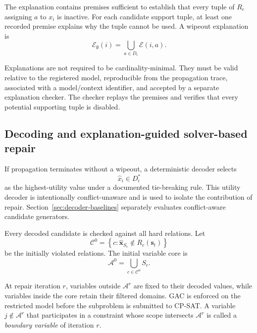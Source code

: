 \documentclass[pdflatex,sn-mathphys-num,iicol,oneside]{sn-jnl}
\newcommand{\gac}{\textsc{GAC}\xspace}
\newcommand{\cpsat}{\textsc{CP-SAT}\xspace}
\begin{document}
The explanation contains premises sufficient to establish that every
tuple of $R_c$ assigning $a$ to $x_i$ is inactive. For each candidate
support tuple, at least one recorded premise explains why the tuple
cannot be used. A wipeout explanation is
\begin{equation}
\mathcal{E}_{\emptyset}(i)
=
\bigcup_{a\in D_i}
\mathcal{E}(i,a).
\end{equation}

Explanations are not required to be cardinality-minimal. They must be
valid relative to the registered model, reproducible from the
propagation trace, associated with a model/context identifier, and
accepted by a separate explanation checker. The checker replays the
premises and verifies that every potential supporting tuple is
disabled.

\subsection{Decoding and explanation-guided solver-based repair}
\label{sec:repair}

If propagation terminates without a wipeout, a deterministic decoder
selects
\begin{equation}
\widehat{x}_i\in D_i^{*}
\end{equation}
as the highest-utility value under a documented tie-breaking rule.
This utility decoder is intentionally conflict-unaware and is used to
isolate the contribution of repair. Section~\ref{sec:decoder-baselines}
separately evaluates conflict-aware candidate generators.

Every decoded candidate is checked against all hard relations. Let
\begin{equation}
\mathcal{C}^{0}
=
\left\{
c:
\widehat{\bm{x}}_{S_c}
\notin
R_c(\bm{s}_t)
\right\}
\end{equation}
be the initially violated relations. The initial variable core is
\begin{equation}
\mathcal{A}^{0}
=
\bigcup_{c\in\mathcal{C}^{0}}S_c.
\end{equation}

At repair iteration $r$, variables outside
$\mathcal{A}^{r}$ are fixed to their decoded values, while variables
inside the core retain their filtered domains. \gac is enforced on
the restricted model before the subproblem is submitted to \cpsat.
A variable $j\notin\mathcal{A}^{r}$ that participates in a constraint
whose scope intersects $\mathcal{A}^{r}$ is called a
\emph{boundary variable} of iteration $r$.
\end{document}
